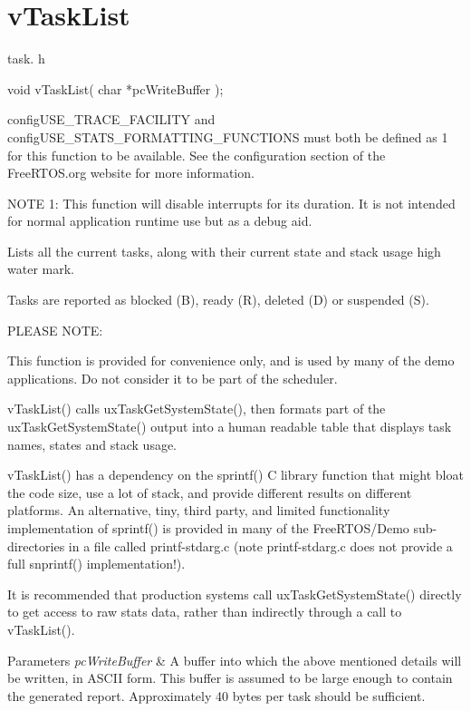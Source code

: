 \hypertarget{group__v_task_list}{}\section{v\+Task\+List}
\label{group__v_task_list}
task. h 
\begin{DoxyPre}void vTaskList( char *pcWriteBuffer );\end{DoxyPre}


config\+U\+S\+E\+\_\+\+T\+R\+A\+C\+E\+\_\+\+F\+A\+C\+I\+L\+I\+T\+Y and config\+U\+S\+E\+\_\+\+S\+T\+A\+T\+S\+\_\+\+F\+O\+R\+M\+A\+T\+T\+I\+N\+G\+\_\+\+F\+U\+N\+C\+T\+I\+O\+N\+S must both be defined as 1 for this function to be available. See the configuration section of the Free\+R\+T\+O\+S.\+org website for more information.

N\+O\+T\+E 1\+: This function will disable interrupts for its duration. It is not intended for normal application runtime use but as a debug aid.

Lists all the current tasks, along with their current state and stack usage high water mark.

Tasks are reported as blocked (\textquotesingle{}B\textquotesingle{}), ready (\textquotesingle{}R\textquotesingle{}), deleted (\textquotesingle{}D\textquotesingle{}) or suspended (\textquotesingle{}S\textquotesingle{}).

P\+L\+E\+A\+S\+E N\+O\+T\+E\+:

This function is provided for convenience only, and is used by many of the demo applications. Do not consider it to be part of the scheduler.

v\+Task\+List() calls ux\+Task\+Get\+System\+State(), then formats part of the ux\+Task\+Get\+System\+State() output into a human readable table that displays task names, states and stack usage.

v\+Task\+List() has a dependency on the sprintf() C library function that might bloat the code size, use a lot of stack, and provide different results on different platforms. An alternative, tiny, third party, and limited functionality implementation of sprintf() is provided in many of the Free\+R\+T\+O\+S/\+Demo sub-\/directories in a file called printf-\/stdarg.\+c (note printf-\/stdarg.\+c does not provide a full snprintf() implementation!).

It is recommended that production systems call ux\+Task\+Get\+System\+State() directly to get access to raw stats data, rather than indirectly through a call to v\+Task\+List().


\begin{DoxyParams}{Parameters}
{\em pc\+Write\+Buffer} & A buffer into which the above mentioned details will be written, in A\+S\+C\+I\+I form. This buffer is assumed to be large enough to contain the generated report. Approximately 40 bytes per task should be sufficient. \\
\hline
\end{DoxyParams}
